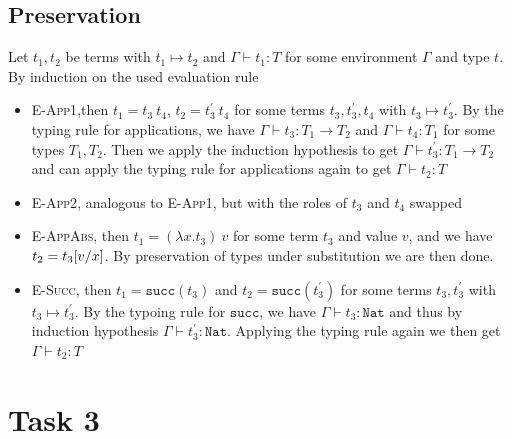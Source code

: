 \documentclass{article}
\newcommand{\subst}[3]{\ensuremath #1[#2/#3]}
\begin{document}
\subsection*{Preservation}
Let $t_1,t_2$ be terms with $t_1\mapsto t_2$ and $\Gamma\vdash t_1:T$ for some environment $\Gamma$ and type $t$.
By induction on the used evaluation rule 
\begin{itemize}
\item \textsc{E-App1},then $t_1 = t_3\ t_4$, $t_2 = t_3^{\prime}\ t_4$ for some terms $t_3,t_3^{\prime},t_4$ with $t_3\mapsto t_3^{\prime}$.
By the typing rule for applications, we have $\Gamma\vdash t_3:T_1\rightarrow T_2$ and $\Gamma \vdash t_4:T_1$ for some types $T_1,T_2$. 
Then we apply the induction hypothesis to get $\Gamma\vdash t_3^{\prime}:T_1\rightarrow T_2$ and can apply the typing rule for applications again to get $\Gamma\vdash t_2:T$
\item \textsc{E-App2}, analogous to \textsc{E-App1}, but with the roles of $t_3$ and $t_4$ swapped
\item \textsc{E-AppAbs}, then $t_1 = (\lambda x.t_3)\ v$ for some term $t_3$ and value $v$, and we have $t_2 = \subst{t_3}{v}{x}$.
By preservation of types under substitution we are then done.
\item \textsc{E-Succ}, then $t_1=\mathtt{succ}(t_3)$ and $t_2=\mathtt{succ}(t_3^{\prime})$ for some terms $t_3,t_3^{\prime}$ with $t_3\mapsto t_3^{\prime}$.
By the typoing rule for $\mathtt{succ}$, we have $\Gamma \vdash t_3:\mathtt{Nat}$ and thus by induction hypothesis $\Gamma \vdash t_3^{\prime}:\mathtt{Nat}$.
Applying the typing rule again we then get $\Gamma \vdash t_2:T$
\end{itemize}

\section*{Task 3}
\end{document}
